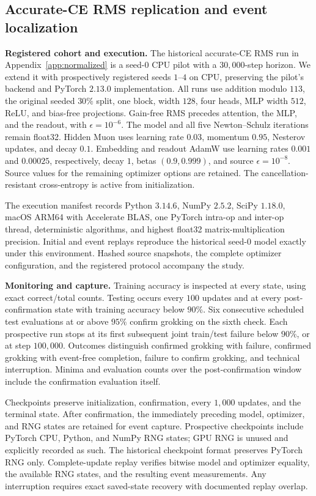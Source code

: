 \subsection{Accurate-CE RMS replication and event localization}
\label{app:rms-replication}

\textbf{Registered cohort and execution.} The historical accurate-CE RMS run in Appendix~\ref{app:normalized} is a seed-$0$ CPU pilot with a $30{,}000$-step horizon. We extend it with prospectively registered seeds $1$--$4$ on CPU, preserving the pilot's backend and PyTorch $2.13.0$ implementation. All runs use addition modulo $113$, the original seeded $30\%$ split, one block, width $128$, four heads, MLP width $512$, ReLU, and bias-free projections. Gain-free RMS precedes attention, the MLP, and the readout, with $\epsilon=10^{-6}$. The model and all five Newton--Schulz iterations remain float32. Hidden Muon uses learning rate $0.03$, momentum $0.95$, Nesterov updates, and decay $0.1$. Embedding and readout AdamW use learning rates $0.001$ and $0.00025$, respectively, decay $1$, betas $(0.9,0.999)$, and source $\epsilon=10^{-8}$. Source values for the remaining optimizer options are retained. The cancellation-resistant cross-entropy is active from initialization.

The execution manifest records Python $3.14.6$, NumPy $2.5.2$, SciPy $1.18.0$, macOS ARM64 with Accelerate BLAS, one PyTorch intra-op and inter-op thread, deterministic algorithms, and highest float32 matrix-multiplication precision. Initial and event replays reproduce the historical seed-$0$ model exactly under this environment. Hashed source snapshots, the complete optimizer configuration, and the registered protocol accompany the study.

\textbf{Monitoring and capture.} Training accuracy is inspected at every state, using exact correct/total counts. Testing occurs every $100$ updates and at every post-confirmation state with training accuracy below $90\%$. Six consecutive scheduled test evaluations at or above $95\%$ confirm grokking on the sixth check. Each prospective run stops at its first subsequent joint train/test failure below $90\%$, or at step $100{,}000$. Outcomes distinguish confirmed grokking with failure, confirmed grokking with event-free completion, failure to confirm grokking, and technical interruption. Minima and evaluation counts over the post-confirmation window include the confirmation evaluation itself.

Checkpoints preserve initialization, confirmation, every $1{,}000$ updates, and the terminal state. After confirmation, the immediately preceding model, optimizer, and RNG states are retained for event capture. Prospective checkpoints include PyTorch CPU, Python, and NumPy RNG states; GPU RNG is unused and explicitly recorded as such. The historical checkpoint format preserves PyTorch RNG only. Complete-update replay verifies bitwise model and optimizer equality, the available RNG states, and the resulting event measurements. Any interruption requires exact saved-state recovery with documented replay overlap.

